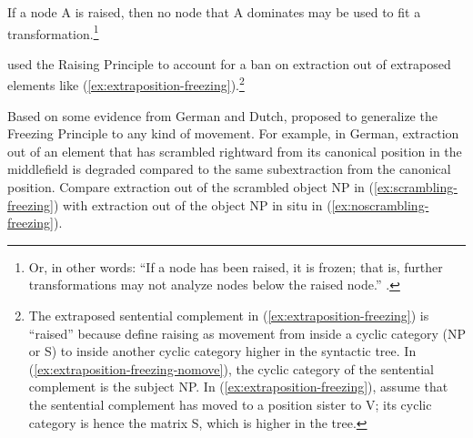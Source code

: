 \ea If a node A is raised, then no node that A dominates may be used to fit a transformation.\footnote{Or, in other words: ``If a node has been raised, it is
frozen; that is, further transformations may not analyze nodes below the raised node.'' \citep[28]{Wexler.1980}.} \citep[341]{Wexler.1980}
\label{rule:raising-principle}
\z 

 \citeauthor{Wexler.1980} used the Raising Principle to account for a ban on extraction out of extraposed elements like (\ref{ex:extraposition-freezing}).\footnote{The extraposed sentential complement in (\ref{ex:extraposition-freezing}) is ``raised'' because \citet{Wexler.1980} define raising as movement from inside a cyclic category (NP or S) to inside another cyclic category higher in the syntactic tree. In (\ref{ex:extraposition-freezing-nomove}), the cyclic category of the sentential complement is the subject NP. In (\ref{ex:extraposition-freezing}), \citet{Wexler.1980} assume that the sentential complement has moved to a position sister to V; its cyclic category is hence the matrix S, which is higher in the tree.} 

\begin{exe}
\ex \citep[341--342]{Wexler.1980}
    \begin{xlist}
     \label{ex:extraposition-freezing-nomove}
     \label{ex:extraposition-freezing}
    \end{xlist}
\end{exe}

Based on some evidence from German and Dutch, \citet{Mueller.G.1998} proposed to generalize the Freezing Principle to any kind of movement. For example, in German, extraction out of an element that has scrambled rightward from its canonical position in the middlefield is degraded compared to the same subextraction from the canonical position. Compare extraction out of the scrambled object NP in (\ref{ex:scrambling-freezing}) with extraction out of the object NP in situ in (\ref{ex:noscrambling-freezing}). 

\begin{exe}
\ex \citep[20]{Mueller.G.1998}
\begin{xlist}
 \label{ex:scrambling-freezing}
\end{xlist}
\end{exe}

